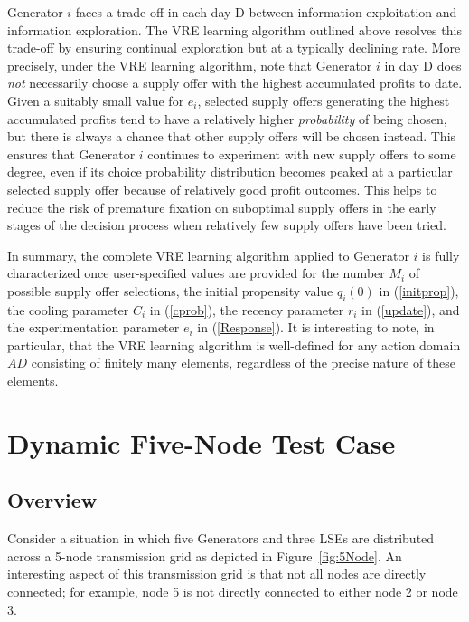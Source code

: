 \documentclass[12pt]{article}
\begin{document}
      Generator $i$ faces a trade-off in each day D between information
exploitation and information exploration.  The VRE learning algorithm outlined 
above resolves this trade-off by ensuring continual exploration but at a typically
declining rate.  More precisely, under the VRE learning algorithm, note that
Generator $i$ in day D does {\it not\/} necessarily choose a supply
offer with the highest accumulated profits to date.  Given a suitably small
value for $e_{i}$, selected supply offers generating the highest accumulated
profits tend to have a relatively higher {\it probability\/} of being chosen,
but there is always a chance that other supply offers will be chosen instead.
This ensures that Generator $i$ continues to experiment with new supply
offers to some degree, even if its choice probability distribution becomes
peaked at a particular selected supply offer because of relatively good
profit outcomes.  This helps to reduce the risk of premature fixation on
suboptimal supply offers in the early stages of the decision process when
relatively few supply offers have been tried.

In summary, the complete VRE learning algorithm  applied to Generator $i$ is 
fully characterized once user-specified values are provided for the number 
$M_i$ of possible supply offer selections, the
initial propensity value $q_{i}(0)$ in (\ref{initprop}), the cooling
parameter $C_{i}$ in (\ref{cprob}), the recency parameter $r_{i} $ in
(\ref{update}), and the experimentation parameter $e_{i}$ in
(\ref{Response}).   It is interesting to note, in particular, that the VRE learning 
algorithm is well-defined for any action domain $AD$ consisting of finitely many elements, 
regardless of the precise nature of these elements.



\section{Dynamic Five-Node Test Case \label{5NodeTestCase}  }

\subsection{Overview \label{5NodeOverview} }

Consider a situation in which five Generators and three LSEs are distributed across a 5-node transmission grid as depicted in Figure~\ref{fig:5Node}.  An interesting aspect of this transmission grid is that not all nodes are directly connected; for example, node 5 is not directly connected to either node 2 or node 3.  
\end{document}
